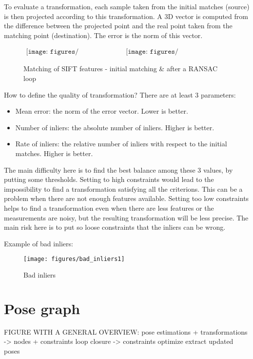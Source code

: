 To evaluate a transformation, each sample taken from the initial matches (source) is then projected according to this transformation. A 3D vector is computed from the difference between the projected point and the real point taken from the matching point (destination). The error is the norm of this vector.

\begin{figure}[h]
\centering$
\begin{array}{cc}
\texttt{[image: figures/sift\_matching\_init]} &
\texttt{[image: figures/sift\_matching\_ransac]}
\end{array}$
\caption{Matching of SIFT features - initial matching \& after a RANSAC loop}
\end{figure}

How to define the quality of transformation? There are at least 3 parameters:
\begin{itemize}
\item Mean error: the norm of the error vector. Lower is better.
\item Number of inliers: the absolute number of inliers. Higher is better.
\item Rate of inliers: the relative number of inliers with respect to the initial matches. Higher is better.
\end{itemize}

The main difficulty here is to find the best balance among these 3 values, by putting some thresholds. Setting to high constraints would lead to the impossibility to find a transformation satisfying all the criterions. This can be a problem when there are not enough features available. Setting too low constraints helps to find a transformation even when there are less features or the measurements are noisy, but the resulting transformation will be less precise. The main risk here is to put so loose constraints that the inliers can be wrong.

Example of bad inliers:

\begin{figure}[h]
\centering
\texttt{[image: figures/bad\_inliers1]}
\caption{Bad inliers}
\end{figure}

\chapter{Pose graph}
\label{chap:graph}

FIGURE WITH A GENERAL OVERVIEW: 
pose estimations + transformations -> nodes + constraints
loop closure -> constraints
optimize
extract updated poses


